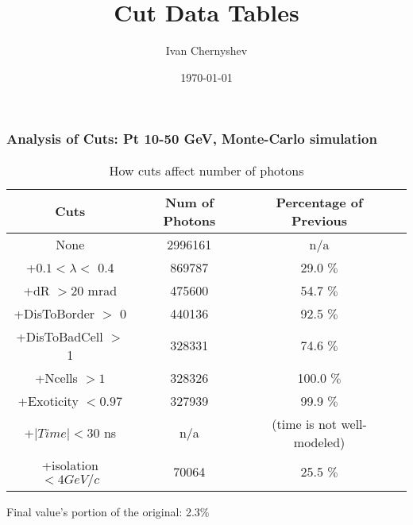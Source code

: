 \documentclass{beamer}
\title{Cut Data Tables}
\author{Ivan Chernyshev}
\date{\today}
\begin{document}
 

\frame 
{ 
\frametitle{Analysis of Cuts: Pt 10-50 GeV, Monte-Carlo simulation} 
\begin{table} 
\caption{How cuts affect number of photons} 
\centering 
\begin{tabular}{c c c c} 
\hline\hline 
Cuts & Num of Photons & Percentage of Previous\\ [0.5ex] 
\hline
None & 2996161 & n/a\\
+$0.1 < \lambda <$ 0.4 & 869787 & 29.0 $\%$ \\
+dR $> 20$ mrad & 475600 & 54.7 $\%$ \\
+DisToBorder $>$ 0 & 440136 & 92.5 $\%$ \\
+DisToBadCell $>$ 1 & 328331 & 74.6 $\%$ \\
+Ncells $> 1$ & 328326 & 100.0 $\%$ \\
+Exoticity $< 0.97$ & 327939 & 99.9 $\%$ \\
+$|Time| < 30$ ns & n/a & (time is not well-modeled)  \\
+isolation $< 4 GeV/c$ & 70064 & 25.5 $\%$ \\
[1ex] 
\hline 
\end{tabular} 
\label{table:nonlin} 
\end{table} 
 Final value's portion of the original: 2.3\%
 } 
\end{document}
